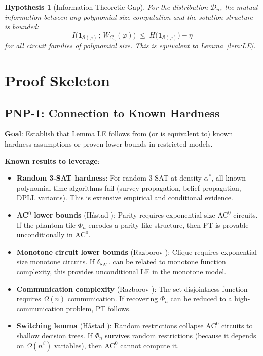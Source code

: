 \documentclass[11pt]{article}
\newtheorem{hypothesis}[lemma]{Hypothesis}
\theoremstyle{definition}
\begin{document}
\begin{hypothesis}[Information-Theoretic Gap]
\label{hyp:info-gap}
For the distribution $\mathcal{D}_n$, the mutual information between any polynomial-size
computation and the solution structure is bounded:
\[
  I\bigl(\mathbf{1}_{\mathcal{S}(\varphi)} \,;\, W_{C_n}(\varphi)\bigr)
  \;\leq\;
  H\bigl(\mathbf{1}_{\mathcal{S}(\varphi)}\bigr) - \eta
\]
for all circuit families of polynomial size.
This is equivalent to Lemma~\ref{lem:LE}.
\end{hypothesis}

\section{Proof Skeleton}

\subsection{PNP-1: Connection to Known Hardness}

\textbf{Goal}: Establish that Lemma LE follows from (or is equivalent to) known hardness assumptions or proven lower bounds in restricted models.

\textbf{Known results to leverage}:
\begin{itemize}
  \item \textbf{Random 3-SAT hardness}: For random 3-SAT at density $\alpha^*$,
    all known polynomial-time algorithms fail (survey propagation, belief propagation,
    DPLL variants).  This is extensive empirical and conditional evidence.
  \item \textbf{AC$^0$ lower bounds} (H\aa stad \cite{Hastad}): Parity requires
    exponential-size $\mathrm{AC}^0$ circuits.  If the phantom tile $\Phi_n$ encodes
    a parity-like structure, then PT is provable unconditionally in $\mathrm{AC}^0$.
  \item \textbf{Monotone circuit lower bounds} (Razborov \cite{Raz}): Clique requires
    exponential-size monotone circuits.  If $\delta_{\mathrm{SAT}}$ can be related to
    monotone function complexity, this provides unconditional LE in the monotone model.
  \item \textbf{Communication complexity} (Razborov \cite{Raz2}): The set disjointness
    function requires $\Omega(n)$ communication.  If recovering $\Phi_n$ can be reduced
    to a high-communication problem, PT follows.
  \item \textbf{Switching lemma} (H\aa stad \cite{Hastad}): Random restrictions collapse
    $\mathrm{AC}^0$ circuits to shallow decision trees.  If $\Phi_n$ survives random
    restrictions (because it depends on $\Omega(n^\beta)$ variables), then $\mathrm{AC}^0$
    cannot compute it.
\end{itemize}
\end{document}
